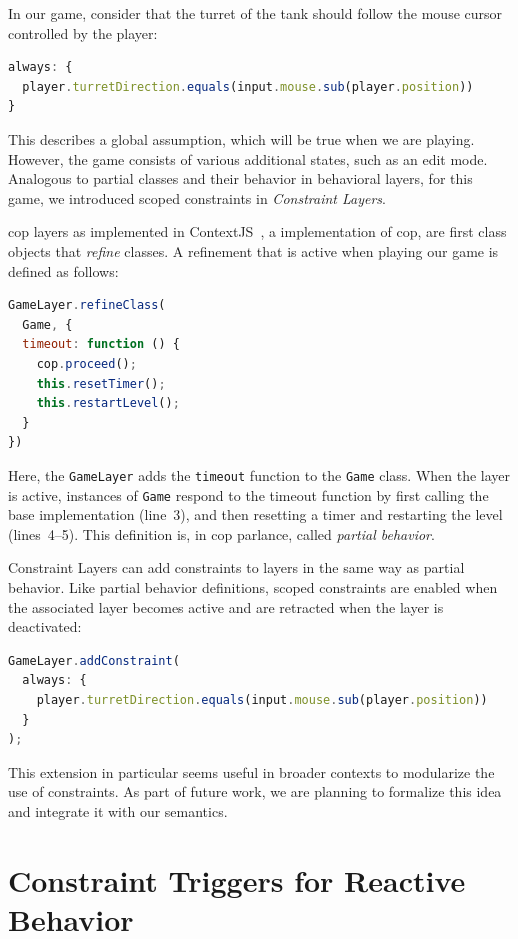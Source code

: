 In our game, consider that the turret of the tank should follow the mouse cursor
controlled by the player:
\begin{lstlisting}[language=JavaScript]
always: {
  player.turretDirection.equals(input.mouse.sub(player.position))
}
\end{lstlisting}
This describes a global assumption, which will be true when we are playing. However,
the game consists of various additional states, such as an edit mode. Analogous
to partial classes and their behavior in behavioral layers, for this game, we
introduced scoped constraints in \emph{Constraint Layers}.

\ac{cop} layers as implemented in ContextJS~\cite{Lincke:2011:instance-specific-adaption}, a \javascript implementation of
\ac{cop}, are first class objects that \emph{refine} classes. A refinement that
is active when playing our game is defined as follows:
\begin{lstlisting}[language=JavaScript]
GameLayer.refineClass(
  Game, {
  timeout: function () {
    cop.proceed();
    this.resetTimer();
    this.restartLevel();
  }
})
\end{lstlisting}
Here, the \lstinline{GameLayer} adds the \lstinline{timeout} function to the
\lstinline{Game} class. When the layer is active, instances of \lstinline{Game}
respond to the timeout function by first calling the base implementation
(line~3), and then resetting a timer and restarting the level (lines~4--5). This
definition is, in \ac{cop} parlance, called \emph{partial behavior}.

Constraint Layers can add constraints to layers in the same way as partial
behavior. Like partial behavior definitions, scoped constraints are enabled when
the associated layer becomes active and are retracted when the layer is
deactivated:
\begin{lstlisting}[language=JavaScript]
GameLayer.addConstraint(
  always: {
    player.turretDirection.equals(input.mouse.sub(player.position))
  }
);
\end{lstlisting}

This extension in particular seems useful in broader contexts to modularize the
use of constraints. As part of future work, we are planning to formalize this
idea and integrate it with our semantics.

\medskip\kern0pt
\section{Constraint Triggers for Reactive Behavior}
\label{sec:constraint-triggers}


